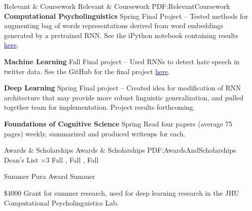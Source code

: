 \documentclass[letterpaper,MMMyyyy,nonstopmode,14pt]{simpleresumecv}
\begin{document}
\begin{Body}
\Section
{Relevant \&\newline
Coursework}
{Relevant \& Coursework}
{PDF:RelevantCoursework}
\Entry
\textbf{Computational Psycholinguistics}
\hfill
Spring 
\BulletItem Final Project -- Tested methods for augmenting bag of words representations derived from word embeddings generated by a pretrained RNN. See the iPython notebook containing results \href{https://colab.research.google.com/drive/1kFQBBpB4OsvXB-TgVbNJ3vMr8DvYw9DF?usp=sharing}{\textcolor{blue}{here}}.

\Entry
\textbf{Machine Learning}
\hfill
Fall 
\BulletItem Final project -- Used RNNs to detect hate speech in twitter data. See the GitHub for the final project \href{https://github.com/adityayedetore/hate-speech-and-offensive-language}{\textcolor{blue}{here}}. 

\Entry
\textbf{Deep Learning}
\hfill
Spring 
\BulletItem Final project -- Created idea for modification of RNN architecture that may provide more robust linguistic generalization, and pulled together team for implementation. Project results forthcoming. 

\Entry
\textbf{Foundations of Cognitive Science}
\hfill
Spring 
\BulletItem Read four papers (average 75 pages) weekly, summarized and produced writeups for each. 

\Section
{Awards \&\newline
Scholarships}
{Awards \& Scholarships}
{PDF:AwardsAndScholarships}
\BulletItem
Dean's List $\times3$
\hfill
Fall , Fall , Fall   

\BulletItem
Summer Pura Award
\hfill
Summer 
\begin{Detail}
    \SubBulletItem \$4000 Grant for summer research, used for deep learning research in the JHU Computational Psycholinguistics Lab. 
\end{Detail}
\end{Body}

\end{document}
